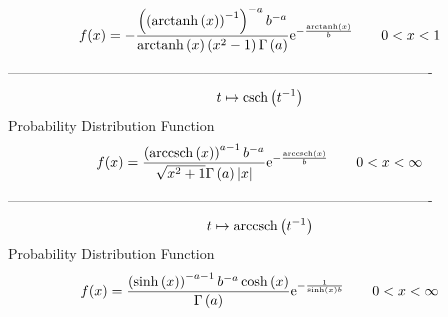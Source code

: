 \documentclass[12pt]{article}
\begin{document}
$$  f(x)=-{\frac { \left(  \left( {\rm arctanh} \left(x\right) \right) ^{-1}
 \right) ^{-a}{b}^{-a}}{{\rm arctanh} \left(x\right) \left( {x}^{2}-1
 \right) \Gamma \left( a \right) }{{\rm e}^{-{\frac {{\rm arctanh} 
\left(x\right)}{b}}}}}
 \qquad0
 < x < 1
$$-------------------------------------------------------------------------------------------  \\$$t\mapsto {\rm csch} \left({t}^{-1}\right)
$$Probability Distribution Function 
$$  f(x)={\frac { \left( {\rm arccsch} \left(x\right) \right) ^{a-1}{b}^{-a}}{
\sqrt {{x}^{2}+1}\Gamma \left( a \right)  \left| x \right| }{{\rm e}^{
-{\frac {{\rm arccsch} \left(x\right)}{b}}}}}
 \qquad0
 < x < \infty 
$$-------------------------------------------------------------------------------------------  \\$$t\mapsto {\rm arccsch} \left({t}^{-1}\right)
$$Probability Distribution Function 
$$  f(x)={\frac { \left( \sinh \left( x \right)  \right) ^{-a-1}{b}^{-a}\cosh
 \left( x \right) }{\Gamma \left( a \right) }{{\rm e}^{-{\frac {1}{
\sinh \left( x \right) b}}}}}
 \qquad0
 < x < \infty 
$$
\end{document}
